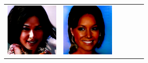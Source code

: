 \documentclass{article}
\newcommand{\pganw}{1.0in}
\begin{document}
\begin{table}[htbp]
\begin{center}
\begin{tabular}{cc|cc|cc}
\includegraphics[width=\pganw]{figures/pgan/10_base_raw_reject.png} &
\includegraphics[width=\pganw]{figures/pgan/11_base_raw_base.png} &

\end{tabular}
\end{center}
\end{table}
\end{document}
